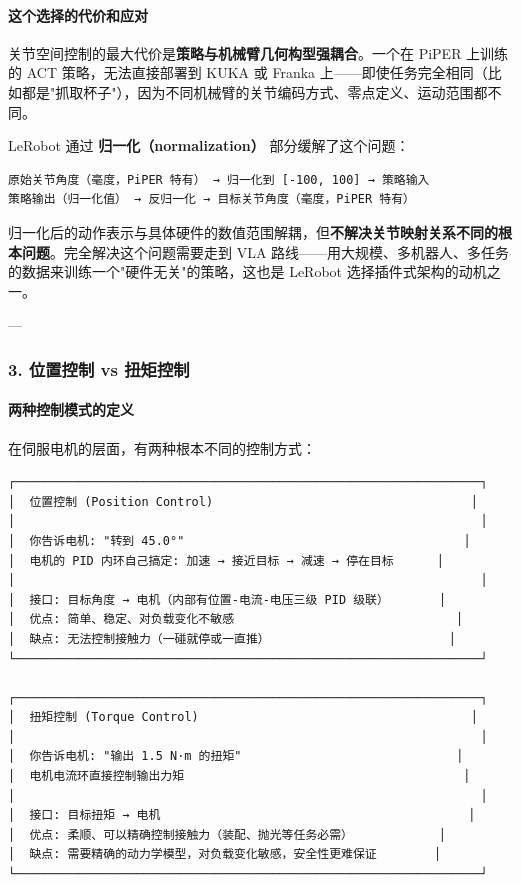 \documentclass[UTF8,a4paper,11pt]{ctexart}
\begin{document}
\paragraph{这个选择的代价和应对}


关节空间控制的最大代价是\textbf{策略与机械臂几何构型强耦合}。一个在 PiPER 上训练的 ACT 策略，无法直接部署到 KUKA 或 Franka 上——即使任务完全相同（比如都是"抓取杯子"），因为不同机械臂的关节编码方式、零点定义、运动范围都不同。

LeRobot 通过 \textbf{归一化（normalization）} 部分缓解了这个问题：

\begin{lstlisting}[language=text]
原始关节角度（毫度，PiPER 特有） → 归一化到 [-100, 100] → 策略输入
策略输出（归一化值） → 反归一化 → 目标关节角度（毫度，PiPER 特有）
\end{lstlisting}

归一化后的动作表示与具体硬件的数值范围解耦，但\textbf{不解决关节映射关系不同的根本问题}。完全解决这个问题需要走到 VLA 路线——用大规模、多机器人、多任务的数据来训练一个"硬件无关"的策略，这也是 LeRobot 选择插件式架构的动机之一。

---

\subsubsection{3. 位置控制 vs 扭矩控制}

\paragraph{两种控制模式的定义}


在伺服电机的层面，有两种根本不同的控制方式：

\begin{lstlisting}[language=text]
┌─────────────────────────────────────────────────────────────────┐
│  位置控制 (Position Control)                                    │
│                                                                 │
│  你告诉电机: "转到 45.0°"                                       │
│  电机的 PID 内环自己搞定: 加速 → 接近目标 → 减速 → 停在目标      │
│                                                                 │
│  接口: 目标角度 → 电机（内部有位置-电流-电压三级 PID 级联）       │
│  优点: 简单、稳定、对负载变化不敏感                               │
│  缺点: 无法控制接触力（一碰就停或一直推）                         │
└─────────────────────────────────────────────────────────────────┘

┌─────────────────────────────────────────────────────────────────┐
│  扭矩控制 (Torque Control)                                      │
│                                                                 │
│  你告诉电机: "输出 1.5 N·m 的扭矩"                              │
│  电机电流环直接控制输出力矩                                       │
│                                                                 │
│  接口: 目标扭矩 → 电机                                           │
│  优点: 柔顺、可以精确控制接触力（装配、抛光等任务必需）            │
│  缺点: 需要精确的动力学模型，对负载变化敏感，安全性更难保证        │
└─────────────────────────────────────────────────────────────────┘
\end{lstlisting}
\end{document}
